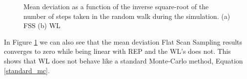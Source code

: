 \begin{figure}[h]
	\centering
	
	\caption{Mean deviation as a function of the inverse square-root of the number of steps taken in the random walk during the simulation. (a) FSS (b) WL}
	\label{fit_comp}
\end{figure}

	In Figure \ref{fit_comp} we can also see that the mean deviation Flat Scan Sampling results converges to zero while being linear with REP and the WL's does not. This shows that WL does not behave like a standard Monte-Carlo method, Equation \ref{standard_mc}.




















